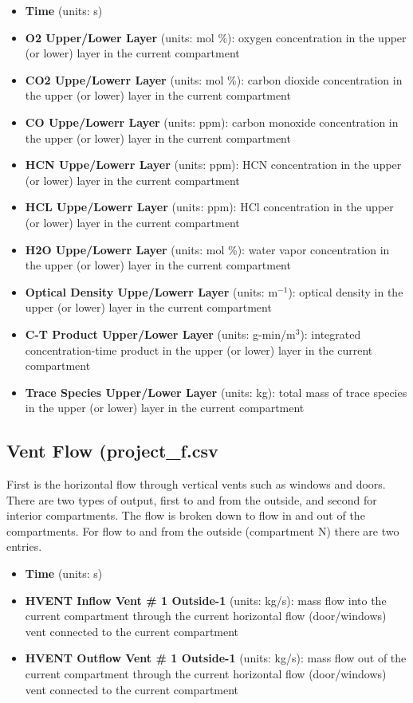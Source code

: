 \begin{itemize}
\item \textbf{Time} (units: s)
\item \textbf{O2 Upper/Lower Layer} (units: mol \%): oxygen concentration in the upper (or lower) layer in the current compartment
\item \textbf{CO2 Uppe/Lowerr Layer} (units: mol \%):  carbon dioxide concentration in the upper (or lower) layer in the current compartment
\item \textbf{CO Uppe/Lowerr Layer} (units: ppm):  carbon monoxide concentration in the upper (or lower) layer in the current compartment
\item \textbf{HCN Uppe/Lowerr Layer} (units: ppm):  HCN concentration in the upper (or lower) layer in the current compartment
\item \textbf{HCL Uppe/Lowerr Layer} (units: ppm):  HCl concentration in the upper (or lower) layer in the current compartment
\item \textbf{H2O Uppe/Lowerr Layer} (units: mol \%):  water vapor concentration in the upper (or lower) layer in the current compartment
\item \textbf{Optical Density Uppe/Lowerr Layer} (units: m$^{-1}$):  optical density in the upper (or lower) layer in the current compartment
\item \textbf{C-T Product Upper/Lower Layer} (units: g-min/m$^3$):  integrated concentration-time product in the upper (or lower) layer in the current compartment
\item \textbf{Trace Species Upper/Lower Layer} (units: kg):  total mass of trace species in the upper (or lower) layer in the current compartment
\end{itemize}

\subsection{Vent Flow (project\_f.csv}

First is the horizontal flow through vertical vents such as windows and doors. There are two types of output, first to and from the outside, and second for interior compartments. The flow is broken down to flow in and out of the compartments. For flow to and from the outside (compartment N) there are two entries.

\begin{itemize}
\item \textbf{Time} (units: s)
\item \textbf{HVENT Inflow Vent \# 1 Outside-1} (units: kg/s): mass flow into the current compartment through the current horizontal flow (door/windows) vent connected to the current compartment
\item \textbf{HVENT Outflow Vent \# 1 Outside-1} (units: kg/s): mass flow out of the current compartment through the current horizontal flow (door/windows) vent connected to the current compartment
\end{itemize}

